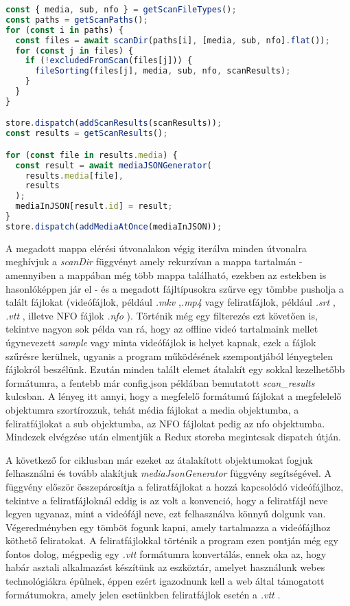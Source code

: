 \begin{lstlisting}[language={ts}]
const { media, sub, nfo } = getScanFileTypes();
const paths = getScanPaths();
for (const i in paths) {
  const files = await scanDir(paths[i], [media, sub, nfo].flat());
  for (const j in files) {
    if (!excludedFromScan(files[j])) {
      fileSorting(files[j], media, sub, nfo, scanResults);
    }
  }
}

store.dispatch(addScanResults(scanResults));
const results = getScanResults();

for (const file in results.media) {
  const result = await mediaJSONGenerator(
    results.media[file],
    results
  );
  mediaInJSON[result.id] = result;
}
store.dispatch(addMediaAtOnce(mediaInJSON));
\end{lstlisting}

A megadott mappa elérési útvonalakon végig iterálva minden útvonalra meghívjuk a {\it scanDir } függvényt amely rekurzívan a mappa tartalmán - amennyiben a mappában még több mappa található, ezekben az estekben is hasonlóképpen jár el - és a megadott fájltípusokra szűrve egy tömbbe pusholja a talált fájlokat (videófájlok, például {\it .mkv },{\it .mp4 } vagy feliratfájlok, például {\it .srt }, {\it .vtt }, illetve NFO fájlok {\it .nfo }). Történik még egy filterezés ezt követően is, tekintve nagyon sok példa van rá, hogy az offline videó tartalmaink mellet úgynevezett {\it sample } vagy minta videófájlok is helyet kapnak, ezek a fájlok szűrésre kerülnek, ugyanis a program működésének szempontjából lényegtelen fájlokról beszélünk. Ezután minden talált elemet átalakít egy sokkal kezelhetőbb formátumra, a fentebb már config.json példában bemutatott {\it scan\_results} kulcsban. A lényeg itt annyi, hogy a megfelelő formátumú fájlokat a megfelelelő objektumra szortírozzuk, tehát média fájlokat a media objektumba, a feliratfájlokat a sub objektumba, az NFO fájlokat pedig az nfo objektumba. Mindezek elvégzése után elmentjük a Redux storeba megintcsak dispatch útján.

A következő for ciklusban már ezeket az átalakított objektumokat fogjuk felhasználni és tovább alakítjuk  {\it mediaJsonGenerator} függvény segítségével. A függvény először összepárosítja a feliratfájlokat a hozzá kapcsolódó videófájlhoz, tekintve a feliratfájloknál eddig is az volt a konvenció, hogy a feliratfájl neve legyen ugyanaz, mint a videófájl neve, ezt felhasználva könnyű dolgunk van. Végeredményben egy tömböt fogunk kapni, amely tartalmazza a videófájlhoz köthető feliratokat. A feliratfájlokkal történik a program ezen pontján még egy fontos dolog, mégpedig egy {\it .vtt } formátumra konvertálás, ennek oka az, hogy habár asztali alkalmazást készítünk az eszköztár, amelyet használunk webes technológiákra épülnek, éppen ezért igazodnunk kell a web által támogatott formátumokra, amely jelen esetünkben feliratfájlok esetén a {\it .vtt }.

